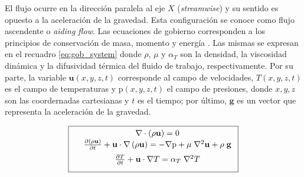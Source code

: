 El flujo ocurre en la dirección paralela al eje $X$ (\textit{streamwise}) y su sentido es opuesto a la aceleración de la gravedad. Esta configuración se conoce como flujo ascendente o \textit{aiding flow}. Las ecuaciones de gobierno corresponden a los principios de conservación de masa, momento y energía \cite{zhou2024direct}. Las mismas se expresan en el recuadro \ref{eq:gob_system} donde $\rho$, $\mu$ y $\alpha_{T}$ son la densidad, la viscosidad dinámica y la difusividad térmica del fluido de trabajo, respectivamente. Por su parte, la variable $\mathbf{u}(x,y,z,t)$ corresponde al campo de velocidades, $T(x,y,z,t)$ es el campo de temperaturas y $\text{p}(x,y,z,t)$ el campo de presiones, donde $x,y,z$ son las coordernadas cartesianas y $t$ es el tiempo; por último, $\mathbf{g}$ es un vector que representa la aceleración de la gravedad.

\begin{equation}
        \boxed{ \begin{array}{lcc}
              &  \nabla \cdot \left( \rho \mathbf{u} \right) = 0 \\
              \vspace*{2mm}
              &  \frac{\partial \left( \rho \mathbf{u} \right)}{\partial t} + \mathbf{u} \cdot \nabla  \left( \rho \mathbf{u} \right) = -\nabla \text{p} + \mu \hspace{1mm} {\nabla}^2 \mathbf{u}  + \rho \hspace{1mm} \mathbf{g} \\
              \vspace*{2mm}
              &  \frac{\partial T}{\partial t} + \mathbf{u} \cdot \nabla T =  \alpha_{T} \hspace{1mm} \nabla^2 T  \\
             \end{array}
               }
             \label{eq:gob_system}
\end{equation}

